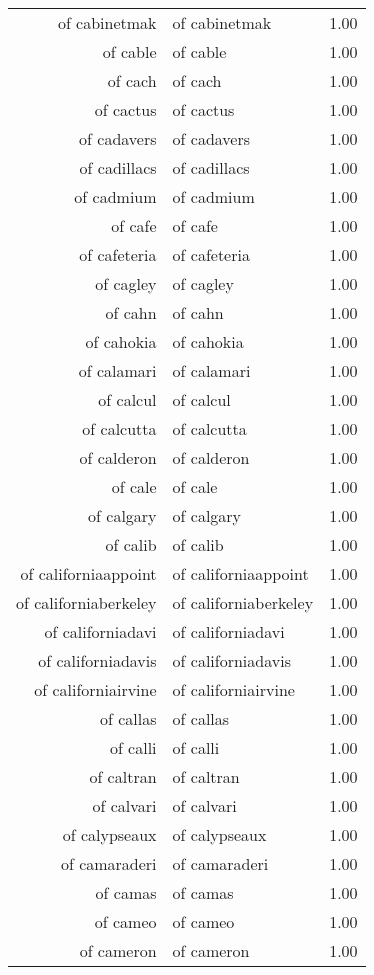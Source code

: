 \begin{table}[ht]
\begin{tabular}{rlr}
  of cabinetmak & of cabinetmak & 1.00 \\ 
  of cable & of cable & 1.00 \\ 
  of cach & of cach & 1.00 \\ 
  of cactus & of cactus & 1.00 \\ 
  of cadavers & of cadavers & 1.00 \\ 
  of cadillacs & of cadillacs & 1.00 \\ 
  of cadmium & of cadmium & 1.00 \\ 
  of cafe & of cafe & 1.00 \\ 
  of cafeteria & of cafeteria & 1.00 \\ 
  of cagley & of cagley & 1.00 \\ 
  of cahn & of cahn & 1.00 \\ 
  of cahokia & of cahokia & 1.00 \\ 
  of calamari & of calamari & 1.00 \\ 
  of calcul & of calcul & 1.00 \\ 
  of calcutta & of calcutta & 1.00 \\ 
  of calderon & of calderon & 1.00 \\ 
  of cale & of cale & 1.00 \\ 
  of calgary & of calgary & 1.00 \\ 
  of calib & of calib & 1.00 \\ 
  of californiaappoint & of californiaappoint & 1.00 \\ 
  of californiaberkeley & of californiaberkeley & 1.00 \\ 
  of californiadavi & of californiadavi & 1.00 \\ 
  of californiadavis & of californiadavis & 1.00 \\ 
  of californiairvine & of californiairvine & 1.00 \\ 
  of callas & of callas & 1.00 \\ 
  of calli & of calli & 1.00 \\ 
  of caltran & of caltran & 1.00 \\ 
  of calvari & of calvari & 1.00 \\ 
  of calypseaux & of calypseaux & 1.00 \\ 
  of camaraderi & of camaraderi & 1.00 \\ 
  of camas & of camas & 1.00 \\ 
  of cameo & of cameo & 1.00 \\ 
  of cameron & of cameron & 1.00 \\ 

\end{tabular}
\end{table}
